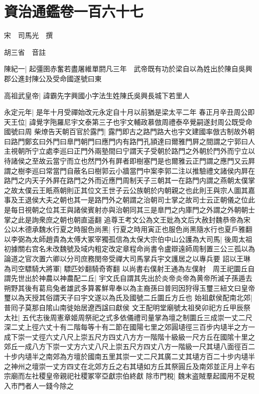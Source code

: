 \section{資治通鑑卷一百六十七}
宋　司馬光　撰

胡三省　音註

陳紀一|{
	起彊圉赤奮若盡屠維單閼凡三年　武帝既有功於梁自以為姓出於陳自吳興郡公進封陳公及受命國遂號曰東}


高祖武皇帝|{
	諱霸先字興國小字法生姓陳氏吳興長城下若里人}


永定元年|{
	是年十月受禪始改元永定自十月以前猶是梁太平二年}
春正月辛丑周公即天王位|{
	諱覺字陁羅尼宇文泰第三子也宇文輔政慕倣周禮泰卒覺嗣遂封周公既受命國號曰周}
柴燎告天朝百官於露門|{
	露門即古之路門路大也宇文建國率倣古制故外朝曰路門鄭玄曰外門曰臯門朝門曰應門内有路門孔頴達曰爾雅門屛之間謂之宁郭曰人主視朝所宁立處李巡曰正門外兩塾間曰宁謂天子受朝於路門之外朝於門外而宁立以待諸侯之至故云當宁而立也然門外有屛者即樹塞門是也爾雅云正門謂之應門又云屛謂之樹李巡曰常當門自蔽名曰樹郭云小牆當門中案李郭二注以推驗禮文諸侯内屛在路門之内天子外屛在路門之外而近應門周制天子三朝其一在路門内謂之燕朝太僕掌之故太僕云王眂燕朝則正其位文王世子云公族朝於内朝親之也此則王與宗人圖其嘉事及王退侯大夫之朝也其一是路門外之朝謂之治朝司士掌之故司士云正朝儀之位此是每日視朝之位其王與諸侯賓射亦與治朝同其三是臯門之内庫門之外謂之外朝朝士掌之此是詢衆庶之朝也朝直遥翻}
追尊王考文公為文王妣為文后大赦封魏恭帝為宋公以木德承魏水行夏之時服色尚黑|{
	行夏之時用寅正也服色尚黑隨水行也夏戶雅翻}
以李弼為太師趙貴為太傅大冢宰獨孤信為太保大宗伯中山公護為大司馬|{
	後周太祖初據關右宫名未改魏號及域内粗定改定章程命尚書令盧辯遠師周制置三公三孤以為論道之官次置六卿以分司庶務閔帝受禪大司馬掌兵宇文護居之以專兵要}
詔以王琳為司空驃騎大將軍|{
	驃匹妙翻騎奇寄翻}
以尚書右僕射王通為左僕射　周王祀圜丘自謂先世出於神農以神農配二丘|{
	宇文氏自謂其先出於炎帝炎帝為黄帝所滅子孫遁去朔野其後有葛烏兔者雄武多算畧鮮卑奉以為主裔孫曰普囘因狩得玉璽三紐文曰皇帝璽以為天授其俗謂天子曰宇文遂以為氏及國號二丘圜丘方丘也}
始祖獻侯配南北郊|{
	普囘子莫那自隂山南徙始居遼西諡曰獻侯}
文王配明堂廟號太祖癸卯祀方丘甲辰祭太社|{
	五代志後周憲章姬周祭祀之式多依儀禮司量掌為壇之制圜丘三成崇一丈二尺深二丈上徑六丈十有二階每等十有二節在國陽七里之郊圓壝徑三百步内壝半之方一成下崇一丈徑六丈八尺上崇五尺方四丈八方方一階階十級級一尺方丘在國隂十里之郊丘一成八方下崇一丈方六丈八尺上崇五尺方四丈八方一階級一尺其壝八面徑百二十步内壝半之南郊為方壇於國南五里其崇一丈二尺其廣二丈其壝方百二十步内壝半之神州之壇崇一丈方四丈在北郊方丘之右其壝如方丘其祭圓丘及南郊並正月上辛右宗廟而左社稷皇帝親祀社稷冢宰亞獻宗伯終獻}
除市門稅|{
	魏末盗賊羣起國用不足稅入市門者人一錢今除之}
